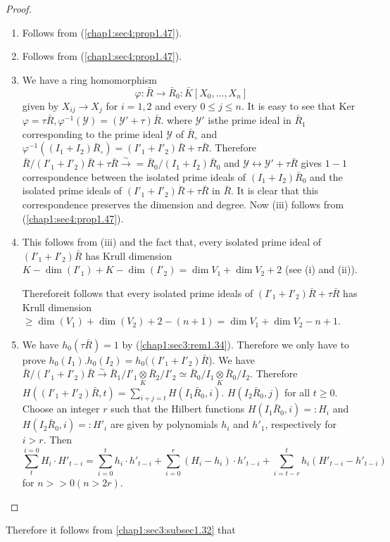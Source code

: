 \begin{proof}%
~
  \begin{enumerate}
  \item Follows from (\ref{chap1:sec4:prop1.47}).
  \item Follows from (\ref{chap1:sec4:prop1.47}).
  \item We have a ring homomorphism
    $$
    \varphi:  \bar{R} \to \bar{R}_0:  \bar{K} [X_0, \ldots,  X_n]
    $$
    given by $X_{ij} \to X_j$ for $i=1,2$ and every $0 \le j \le n$. It is
    easy to see that Ker $\varphi = \tau \bar{R}, \varphi^{-1}
    (\mathscr{Y}) = (\mathscr{Y}' + \tau) \bar{R}$. where $\mathscr{Y}'$
    is\pageoriginale the prime ideal in $\bar{R}_1$ corresponding to the prime ideal
    $\mathscr{Y}$ of $\bar{R}_\circ$ and $ \varphi^{-1} ((I_1 + I_2)
    \bar{R}_\circ) =
    (I'_1 + I'_2) \bar{R} + \tau \bar{R}$. Therefore $\bar{R}/(I'_1 +
    I'_2) \bar{R} + \tau \bar{R} \overset{\sim}{\to} =\bar{R}_0/(I_1 + I_2)
    \bar{R}_0$ and $\mathscr{Y} \leftrightarrow \mathscr{Y}' + \tau
    \bar{R}$ gives $1-1$ correspondence between the isolated prime ideals
    of $(I_1 + I_2) \bar{R}_0$ and the isolated prime ideals of $(I'_1 +
    I'_2) \bar{R} + \tau \bar{R}$ in $\bar{R}$. It is clear that this
    correspondence preserves the dimension and degree. Now (iii) follows
    from (\ref{chap1:sec4:prop1.47}). 
\item This follows from (iii) and the fact that, every isolated
  prime ideal of $(I'_1 + I'_2) \bar{R}$ has Krull dimension $K-\dim
  (I'_1) + K-\dim (I'_2) = \dim V_1 + \dim V_2 + 2$ (see (i) and
  (ii)).  
  
  Therefore\pageoriginale it follows that every isolated prime ideals of  $(I'_1 +
  I'_2) \bar{R}+\tau \bar{R}$ has Krull dimension $\ge \dim (V_1) +
  \dim (V_2)+2- (n+1) = \dim V_1 + \dim V_2 - n + 1$. 
\item We have $h_0 (\tau \bar{R})=1$ by
  (\ref{chap1:sec3:rem1.34}). Therefore we only 
  have to prove $h_0(I_1). h_0 (I_2) = h_0 ((I'_1+ I'_2) \bar{R}$). We
  have $\bar{R}/(I'_1 + I'_2) \bar{R} \overset{\sim}{\to}
  \bar{R}_1/I'_1 \underset{K}{\otimes} \bar{R}_2/I'_2 \simeq
  \bar{R}_0/I_1 \underset{K}{\otimes} \bar{R}_0/I_2$. Therefore
  $H((I'_1 + I'_2) \bar{R}, t) = \sum\limits_{i + j = t} H(I_1
  \bar{R}_0, i)$. $H(I_2 \bar{R}_0, j)$ for all $t \ge 0$. Choose an
  integer $r$ such that the Hilbert functions $H (I_1 \bar{R}_0, i) =:
  H_i$ and $H(I_2 \bar{R}_0, i) =:  H'_i$ are given by polynomials
  $h_i$ and $h'_1$, respectively for $i > r$. Then 
  $$
  \sum^{i = 0}_{t} H_i\cdot H'_{t-i}= \sum^{t}_{i=0} h_i\cdot h'_{t-i} +
  \sum^{r}_{i = 0} (H_i - h_i)\cdot h'_{t-i} + \sum^{t}_{i=t-r} h_i
  (H'_{t-i} -h'_{t-i}) 
  $$ 
  for $n >> 0 (n > 2r)$.
\end{enumerate}
\end{proof}
Therefore it follows from \ref{chap1:sec3:subsec1.32} that


